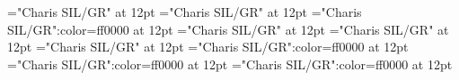 \documentclass[a4paper]{article}
\begin{document}
\pagestyle{plain}
\sloppy
\setlength{\parfillskip}{0pt plus 1fil}
\font\sectionletter="Charis SIL/GR" at 12pt
\font\articlesectionletter="Charis SIL/GR" at 12pt
\font\sensearticlesectionletter="Charis SIL/GR":color=ff0000 at 12pt
\font\headwordfirstoftypesectionletter="Charis SIL/GR" at 12pt
\font\pronunciationfirstoftypearticlesectionletter="Charis SIL/GR" at 12pt
\font\stressfirstoftypepronunciationfirstoftypearticlesectionletter="Charis SIL/GR" at 12pt
\font\grammarcategoryfirstoftypesensearticlesectionletter="Charis SIL/GR":color=ff0000 at 12pt
\font\exampleusefirstoftypesensearticlesectionletter="Charis SIL/GR":color=ff0000 at 12pt
\font\examplefirstoftypesensearticlesectionletter="Charis SIL/GR":color=ff0000 at 12pt

\mbox{} 
\newpage 
\newpage 
\setcounter{page}{1} 
\pagestyle{fancy} 

\end{document}

